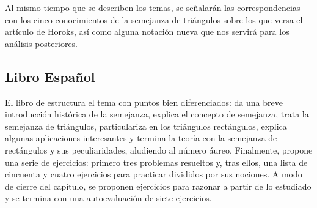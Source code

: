 	Al mismo tiempo que se describen los temas, se señalarán las correspondencias con los cinco conocimientos de la semejanza de triángulos sobre los que versa el artículo de Horoks, así como alguna notación nueva que nos servirá para los análisis posteriores.
	
\subsection{Libro Español}\label{DefConN}

	El libro de \citet{spa} estructura el tema con puntos bien diferenciados: da una breve introducción histórica de la semejanza, explica el concepto de semejanza, trata la semejanza de triángulos, particulariza en los triángulos rectángulos, explica algunas aplicaciones interesantes y termina la teoría con la semejanza de rectángulos y sus peculiaridades, aludiendo al número áureo. Finalmente, propone una serie de ejercicios: primero tres problemas resueltos y, tras ellos, una lista de cincuenta y cuatro ejercicios para practicar divididos por sus nociones. A modo de cierre del capítulo, se proponen ejercicios para razonar a partir de lo estudiado y se termina con una autoevaluación de siete ejercicios. 
	
